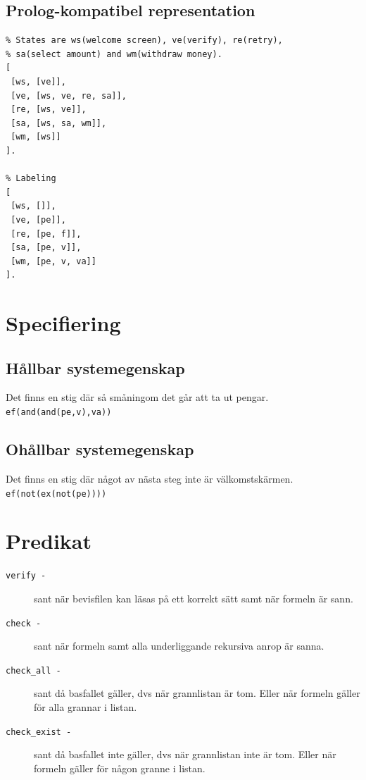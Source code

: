 \documentclass[]{article}
\begin{document}
\clearpage
\subsection{Prolog-kompatibel representation}
\begin{verbatim}
% States are ws(welcome screen), ve(verify), re(retry), 
% sa(select amount) and wm(withdraw money).
[
 [ws, [ve]],
 [ve, [ws, ve, re, sa]],
 [re, [ws, ve]],
 [sa, [ws, sa, wm]],
 [wm, [ws]]
].

% Labeling
[
 [ws, []],
 [ve, [pe]],
 [re, [pe, f]],
 [sa, [pe, v]],
 [wm, [pe, v, va]]
].
\end{verbatim}

\clearpage
\section{Specifiering}

\subsection{Hållbar systemegenskap}
Det finns en stig där så småningom det går att ta ut pengar.\\
\texttt{ef(and(and(pe,v),va))}

\subsection{Ohållbar systemegenskap}
Det finns en stig där något av nästa steg inte är välkomstskärmen.\\
\texttt{ef(not(ex(not(pe))))}

\section{Predikat}
\begin{description}
	\item[\texttt{verify -}] sant när bevisfilen kan läsas på ett korrekt sätt samt när formeln är sann.
	
	\item[\texttt{check -}] sant när formeln samt alla underliggande rekursiva anrop är sanna.
	
	\item[\texttt{check\_all -}] sant då basfallet gäller, dvs när grannlistan är tom. Eller när formeln gäller för alla grannar i listan.
	
	\item[\texttt{check\_exist -}] sant då basfallet inte gäller, dvs när grannlistan inte är tom. Eller när formeln gäller för någon granne i listan.
	
	\end{description}
\end{document}
